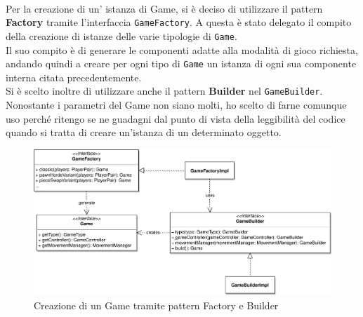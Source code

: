 \documentclass[a4paper,12pt]{report}
\begin{document}
%
\
\\
Per la creazione di un' istanza di Game, si è deciso di utilizzare il pattern \textbf{Factory} tramite l'interfaccia \texttt{GameFactory}.
A questa è stato delegato il compito della creazione di istanze delle varie tipologie di \texttt{Game}.
\\
Il suo compito è di generare le componenti adatte alla modalità di gioco richiesta, andando quindi a creare per ogni tipo di \texttt{Game} un istanza di ogni sua componente interna citata precedentemente.
\\
Si è scelto inoltre di utilizzare anche il pattern \textbf{Builder} nel \texttt{GameBuilder}. Nonostante i parametri del Game non siano molti, ho scelto di farne comunque uso perché ritengo se ne guadagni dal punto di vista della leggibilità del codice quando si tratta di creare un'istanza di un determinato oggetto.
%
\begin{figure}[H]
    \begin{center}
        \centering
        \includegraphics[width=\textwidth]{img/Alessandro/game_creation.png}
    \end{center}
    \caption{Creazione di un Game tramite pattern Factory e Builder}
    \label{img:game_creation}
\end{figure}
%
\end{document}
